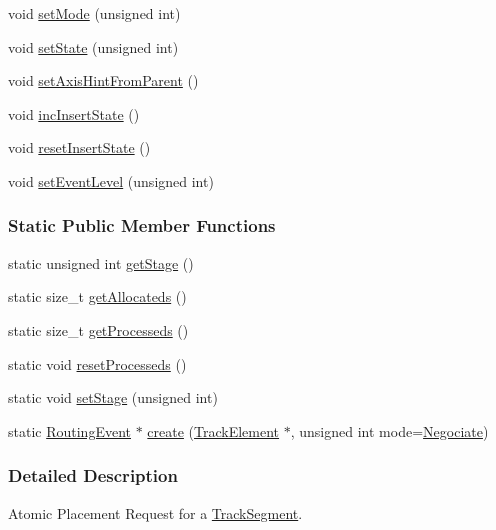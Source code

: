 \begin{DoxyCompactItemize}
void \hyperlink{classKite_1_1RoutingEvent_a85982827650655ef9d6e1206874ead69}{set\-Mode} (unsigned int)
\item 
void \hyperlink{classKite_1_1RoutingEvent_af7ce7f73feb28f3df8f3180632a2f731}{set\-State} (unsigned int)
\item 
void \hyperlink{classKite_1_1RoutingEvent_a02a3f1f2801d4ebbbe676e062878faae}{set\-Axis\-Hint\-From\-Parent} ()
\item 
void \hyperlink{classKite_1_1RoutingEvent_a86c4b1b3d406c12667188ad44ce366db}{inc\-Insert\-State} ()
\item 
void \hyperlink{classKite_1_1RoutingEvent_ae35f271a106f6c6a6039e4a6f8bf4009}{reset\-Insert\-State} ()
\item 
void \hyperlink{classKite_1_1RoutingEvent_a70a9ecd62b806eff001aa602132cc630}{set\-Event\-Level} (unsigned int)
\end{DoxyCompactItemize}
\subsubsection*{Static Public Member Functions}
\begin{DoxyCompactItemize}
\item 
static unsigned int \hyperlink{classKite_1_1RoutingEvent_a110307ff26b264ea83f69aa1bab23626}{get\-Stage} ()
\item 
static size\-\_\-t \hyperlink{classKite_1_1RoutingEvent_a91c8bc1a6bdb1b15c3c084ebfd38af47}{get\-Allocateds} ()
\item 
static size\-\_\-t \hyperlink{classKite_1_1RoutingEvent_a0a3993330692b7eb816e9c776d161ad1}{get\-Processeds} ()
\item 
static void \hyperlink{classKite_1_1RoutingEvent_a6cf10bb4e4488948e4c616c55a8e6514}{reset\-Processeds} ()
\item 
static void \hyperlink{classKite_1_1RoutingEvent_a7300c33d439e453796b170eeaf4bf04d}{set\-Stage} (unsigned int)
\item 
static \hyperlink{classKite_1_1RoutingEvent}{Routing\-Event} $\ast$ \hyperlink{classKite_1_1RoutingEvent_a131ef83c7a57a64aed4f698c0433dffa}{create} (\hyperlink{classKite_1_1TrackElement}{Track\-Element} $\ast$, unsigned int mode=\hyperlink{classKite_1_1RoutingEvent_a46c8a310cf4c094f8c80e1cb8dc1f911a3980b02882c46c9bd4caf15040b85d1a}{Negociate})
\end{DoxyCompactItemize}


\subsubsection{Detailed Description}
Atomic Placement Request for a \hyperlink{classKite_1_1TrackSegment}{Track\-Segment}. 

